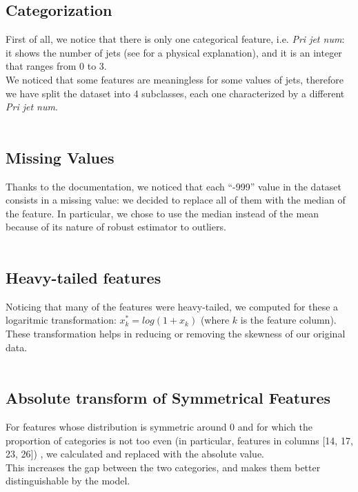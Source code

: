 \documentclass[10pt,conference,compsocconf]{IEEEtran}
\begin{document}
\subsection{Categorization}
First of all, we notice that there is only one categorical feature, i.e. \textit{Pri jet num}: it shows the number of jets (see \cite{higgs} for a physical explanation), and it is an integer that ranges from 0 to 3. \\
We noticed that some features are meaningless for some values of jets, therefore we have split the dataset into 4 subclasses, each one characterized by a different \textit{Pri jet num}.\\
\vspace{-0.7cm}\\

\subsection{Missing Values}
Thanks to the documentation, we noticed that each “-999” value
in the dataset consists in a missing value: we decided to replace all of them with the median of the feature. In particular, we chose to use the median instead of the mean because of its nature of robust estimator to outliers.\\
\vspace{-0.7cm}\\

\subsection{Heavy-tailed features}
Noticing that many of the features were heavy-tailed, we
computed for these a logaritmic transformation: $x_{k}^{*} = log(1+x_k)$ (where $k$ is the feature column). These transformation  helps in reducing or removing the skewness of our original data.\\
\vspace{-0.7cm}\\

\subsection{Absolute transform of Symmetrical Features}
For features whose distribution is symmetric around 0 and
for which the proportion of categories is not too even (in particular, features in columns [14, 17, 23, 26]) , we calculated and replaced with the absolute value.\\
This increases the gap between the two categories, and makes them better distinguishable by the model. \\
\vspace{-0.7cm}\\
\end{document}
